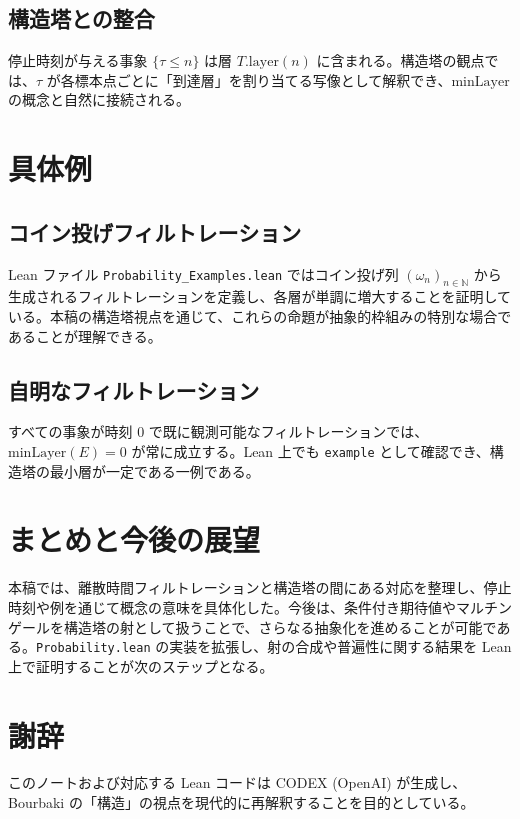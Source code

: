 \documentclass[12pt]{ltjsarticle}
\begin{document}
\subsection{構造塔との整合}
停止時刻が与える事象 $\{\tau \leq n\}$ は層 $T.\mathrm{layer}(n)$ に含まれる。構造塔の観点では、$\tau$ が各標本点ごとに「到達層」を割り当てる写像として解釈でき、$\mathrm{minLayer}$ の概念と自然に接続される。

\section{具体例}
\subsection{コイン投げフィルトレーション}
Lean ファイル \texttt{Probability\_Examples.lean} ではコイン投げ列 $(\omega_n)_{n \in \mathbb{N}}$ から生成されるフィルトレーションを定義し、各層が単調に増大することを証明している。本稿の構造塔視点を通じて、これらの命題が抽象的枠組みの特別な場合であることが理解できる。

\subsection{自明なフィルトレーション}
すべての事象が時刻 $0$ で既に観測可能なフィルトレーションでは、$\mathrm{minLayer}(E)=0$ が常に成立する。Lean 上でも \texttt{example} として確認でき、構造塔の最小層が一定である一例である。

\section{まとめと今後の展望}
本稿では、離散時間フィルトレーションと構造塔の間にある対応を整理し、停止時刻や例を通じて概念の意味を具体化した。今後は、条件付き期待値やマルチンゲールを構造塔の射として扱うことで、さらなる抽象化を進めることが可能である。\texttt{Probability.lean} の実装を拡張し、射の合成や普遍性に関する結果を Lean 上で証明することが次のステップとなる。

\section*{謝辞}
このノートおよび対応する Lean コードは CODEX (OpenAI) が生成し、Bourbaki の「構造」の視点を現代的に再解釈することを目的としている。
\end{document}

